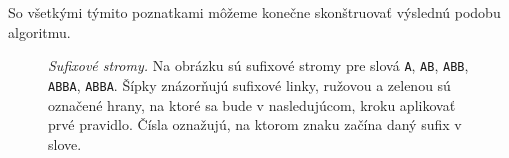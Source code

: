 So všetkými týmito poznatkami môžeme konečne skonštruovať výslednú podobu 
algoritmu.

\begin{figure}
\centering
{}
\qquad
{}
\qquad
{}

\qquad
{}
\caption{\emph{Sufixové stromy.} Na obrázku sú sufixové stromy pre slová 
{\tt A}, {\tt AB}, {\tt ABB}, {\tt ABBA}, {\tt ABBA\uz}. Šípky znázorňujú 
sufixové linky, ružovou a zelenou sú označené hrany, na ktoré sa bude v 
nasledujúcom, kroku aplikovať prvé pravidlo. Čísla oznažujú, na ktorom znaku 
začína daný sufix v slove.}
\label{img:sxsx}
\end{figure}

